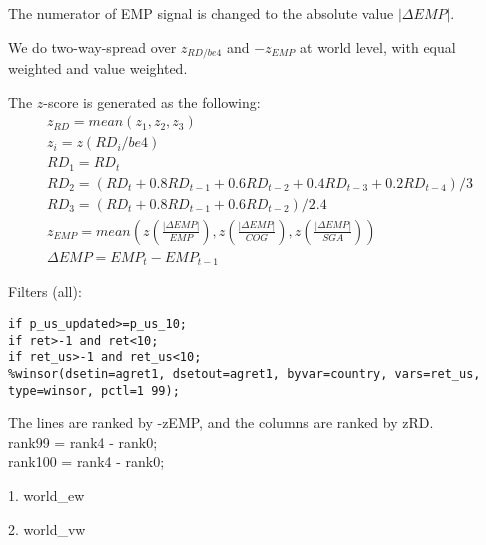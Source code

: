 

\usepackage[T1]{fontenc}




\thispagestyle{fancy}

\newcommand{\code}{\texttt}
\newcommand*{\Commonpath}{20181218/two-way/be4}

The numerator of EMP signal is changed to the absolute value $|\Delta EMP|$.

We do two-way-spread over $z_{RD/be4}$ and $-z_{EMP}$ at world level, with equal weighted and value weighted. 

The $z$-score is generated as the following:
$$
\begin{aligned}
& z_{RD} = mean(z_1, z_2, z_3) \\
& z_i = z(RD_i/be4) \\
& RD_1 = RD_t \\
& RD_2 = (RD_t + 0.8RD_{t-1} + 0.6RD_{t-2} + 0.4RD_{t-3} + 0.2RD_{t-4})/3 \\
& RD_3 = (RD_t + 0.8RD_{t-1} + 0.6RD_{t-2})/2.4 
& \\
& z_{EMP} = mean(z(\frac{|\Delta EMP|}{EMP}), z(\frac{|\Delta EMP|}{COG}), z(\frac{|\Delta EMP|}{SGA})) \\
& \Delta EMP = EMP_t - EMP_{t-1}
\end{aligned}
$$


Filters (all):

\code{if p\_us\_updated>=p\_us\_10;} \\
\code{if ret>-1 and ret<10;} \\
\code{if ret\_us>-1 and ret\_us<10;} \\
\code{\%winsor(dsetin=agret1, dsetout=agret1, byvar=country, vars=ret\_us, type=winsor, pctl=1 99);}


The lines are ranked by -zEMP, and the columns are ranked by zRD. \\
rank99 = rank4 - rank0; \\
rank100 = rank4 - rank0;

\small

% 

1. world\_ew


% 

2. world\_vw





